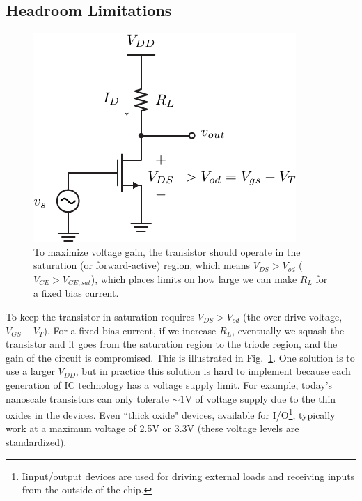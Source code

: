 \subsection{Headroom Limitations}
\begin{figure}[tb]
\centering
\includegraphics[scale=1]{1cs_headroom.pdf}
\caption{To maximize voltage gain, the transistor should operate in the saturation (or forward-active) region, which means $V_{DS} > V_{od}$ ($V_{CE} > V_{CE,sat}$), which places limits on how large we can make $R_L$ for a fixed bias current.}
\label{fig:1cs_headroom.pdf}
\end{figure}
To keep the transistor in saturation requires $V_{DS} > V_{od}$ (the over-drive voltage, $V_{GS} - V_T$).  For a fixed bias current, if we increase $R_L$, eventually we squash the transistor and it goes from the saturation region to the triode region, and the gain of the circuit is compromised.  This is illustrated in Fig.~\ref{fig:1cs_headroom.pdf}.  One solution is to use a larger $V_{DD}$, but in practice this solution is hard to implement because each generation of IC technology has a voltage supply limit.  For example, today's nanoscale transistors can only tolerate $\sim 1$V of voltage supply due to the thin oxides in the devices.  Even ``thick oxide" devices, available for I/O\footnote{Iinput/output devices are used for driving external loads and receiving inputs from the outside of the chip.}, typically work at a maximum voltage of 2.5V or 3.3V (these voltage levels are standardized).
